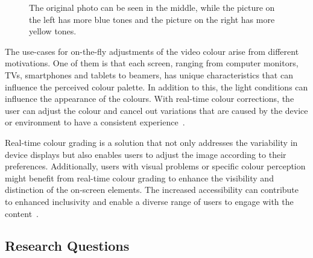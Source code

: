 \documentclass[../MasterThesis.tex]{subfiles}
\begin{document}
	
	\begin{figure}[H]
		\begin{center}
			\caption[Photo in three different colour tones (original, yellow, blue).]{The original photo can be seen in the middle, while the picture on the left has more blue tones and the picture on the right has more yellow tones.}
			\label{figure:coloursblueandyellow}
		\end{center}
	\end{figure}
	The use-cases for on-the-fly adjustments of the video colour arise from different motivations. 
	One of them is that each screen, ranging from computer monitors, TVs, smartphones and tablets to beamers, has unique characteristics that can influence the perceived colour palette. 
	In addition to this, the light conditions can influence the appearance of the colours.
	With real-time colour corrections, the user can adjust the colour and cancel out variations that are caused by the device or environment to have a consistent experience~\cite{screentype}.
	
	Real-time colour grading is a solution that not only addresses the variability in device displays but also enables users to adjust the image according to their preferences.
	Additionally, users with visual problems or specific colour perception might benefit from real-time colour grading to enhance the visibility and distinction of the on-screen elements. 
	The increased accessibility can contribute to enhanced inclusivity and enable a diverse range of users to engage with the content~\cite{accessibility}.
	
	
	

	
	
	
	
	
	
	
	
	
	
	
	\subsection{Research Questions} \label{subsection:researchquestions}
	
\end{document}
